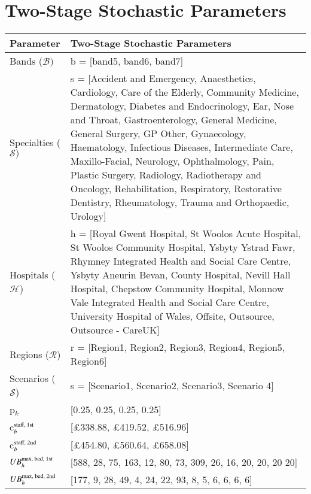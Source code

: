 \documentclass[thesis.tex]{subfiles}
\begin{document}
\section{Two-Stage Stochastic Parameters}
{\footnotesize
\begin{longtable}{lp{12cm}}\toprule
    
        \textbf{Parameter} & \textbf{Two-Stage Stochastic Parameters} \\ \midrule
        Bands ($\mathcal{B})$ & b = [band5, band6, band7]\\  \midrule
        Specialties ($\mathcal{S})$ & s = [Accident and Emergency, Anaesthetics, Cardiology, Care of the Elderly, Community Medicine, Dermatology, Diabetes and Endocrinology, Ear, Nose and Throat, Gastroenterology, General Medicine, General Surgery, GP Other, Gynaecology, Haematology, Infectious Diseases, Intermediate Care, Maxillo-Facial, Neurology, Ophthalmology, Pain, Plastic Surgery, Radiology, Radiotherapy and Oncology, Rehabilitation, Respiratory, Restorative Dentistry, Rheumatology, Trauma and Orthopaedic, Urology]\\\midrule
        Hospitals ($\mathcal{H}$) & h = [Royal Gwent Hospital, St Woolos Acute Hospital, St Woolos Community Hospital, Ysbyty Ystrad Fawr, Rhymney Integrated Health and Social Care Centre, Ysbyty Aneurin Bevan, County Hospital, Nevill Hall Hospital, Chepstow Community Hospital, Monnow Vale Integrated Health and Social Care Centre, University Hospital of Wales, Offsite, Outsource, Outsource - CareUK] \\\midrule
        Regions ($\mathcal{R}$) & r = [Region1, Region2, Region3, Region4, Region5, Region6]\\\midrule
        Scenarios ($\mathcal{S}$) & s = [Scenario1, Scenario2, Scenario3, Scenario 4]\\\midrule
        p$_{k}$ & [0.25, 0.25, 0.25, 0.25] \\\midrule
        c$^\textnormal{staff, 1st}_{b}$ & [$\pounds$338.88,	$\pounds$419.52, $\pounds$516.96]\\\midrule
        c$^\textnormal{staff, 2nd}_{b}$ & [$\pounds$454.80,	$\pounds$560.64, $\pounds$658.08] \\\midrule
        $UB^\textnormal{max, bed, 1st}_{h}$ & [588, 28, 75, 163, 12, 80, 73, 309, 26, 16, 20, 20, 20 20]	   \\\midrule
        $UB^\textnormal{max, bed, 2nd}_{h}$ & [177, 9, 28, 49, 4, 24, 22, 93, 8, 5, 6, 6, 6, 6]	   \\\midrule
               

\end{longtable}}
\end{document}
